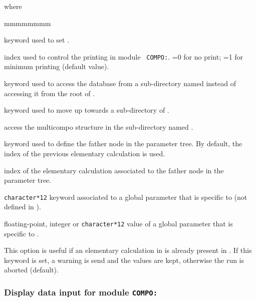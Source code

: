 \noindent where
\begin{ListeDeDescription}{mmmmmmmm}

\item[\moc{EDIT}] keyword used to set .

\item[\dusa{iprint}] index used to control the printing in module {\tt
COMPO:}. =0 for no print; =1 for minimum printing (default value).

\item[\moc{STEP}] keyword used to access the database from a sub-directory named  instead of
accessing it from the root of .

\item[\moc{UP}] keyword used to move up towards a sub-directory of .

\item[\dusa{NAMDIR}] access the {\sc multicompo} structure in the sub-directory named .

\item[\moc{ORIG}] keyword used to define the father node in the parameter tree. By
default, the index of the previous elementary calculation is used.

\item[\dusa{orig}] index of the elementary calculation associated to the father node in the
parameter tree.

\item[\dusa{PARKEY}] {\tt character*12} keyword associated to a
global parameter that is specific to  (not defined in ).

\item[\dusa{value}] floating-point, integer or {\tt character*12} value of a
global parameter that is specific to .

\item[\moc{WARNING-ONLY}] This option is useful if an elementary calculation in  
is already present in . If this keyword is set, a warning is send and the  values
are kept, otherwise the run is aborted (default).

\end{ListeDeDescription}

\clearpage

\subsubsection{Display data input for module {\tt COMPO:}}\label{sect:desccpo4}

